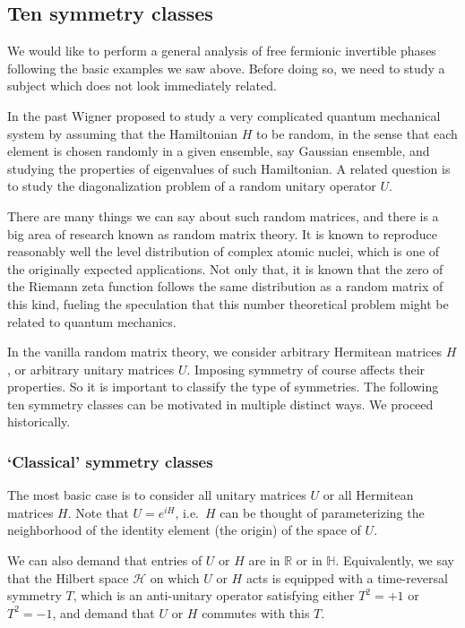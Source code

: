 \documentclass[12pt]{article}
\numberwithin{equation}{section}
\numberwithin{figure}{section}
\theoremstyle{remark}
\def\bH{\mathbb{H}}
\def\bR{\mathbb{R}}
\def\cH{\mathcal{H}}
\begin{document}
\subsection{Ten symmetry classes}

We would like to perform a general analysis of free fermionic invertible phases
following the basic examples we saw above. 
Before doing so, we need to study a subject which does not look immediately related.

In the past Wigner proposed to study a very complicated quantum mechanical system
by assuming that the Hamiltonian $H$ to be random, in the sense that
each element is chosen randomly in a given ensemble, say Gaussian ensemble,
and studying the properties of eigenvalues of such Hamiltonian. 
A related question is to study the diagonalization problem of a random unitary operator $U$.

There are many things we can say about such random matrices, and there is a big area of research known as random matrix theory. 
It is known to reproduce reasonably well the level distribution of complex atomic nuclei,
which is one of the originally expected applications. 
Not only that, it is known that the zero of the Riemann zeta function 
follows the same distribution as a random matrix of this kind,
fueling the speculation that this number theoretical problem might be related to 
quantum mechanics.

In the vanilla random matrix theory, we consider arbitrary Hermitean matrices $H$,
or arbitrary unitary matrices $U$.
Imposing symmetry of course affects their properties. 
So it is important to classify the type of symmetries. 
The following ten symmetry classes can be motivated in multiple distinct ways.
We proceed historically.

\subsubsection{`Classical' symmetry classes}

The most basic case is to consider all unitary matrices $U$ or all Hermitean matrices $H$.
Note that $U=e^{iH}$, i.e.~$H$ can be thought of parameterizing the neighborhood of
the identity element (the origin) of the space of $U$.

We can also demand that entries of $U$ or $H$ are in $\bR$ or in $\bH$.
Equivalently, we say that the Hilbert space $\cH$ on which $U$ or $H$ acts
is equipped with a time-reversal symmetry $T$, which is an anti-unitary operator 
satisfying either $T^2=+1$ or $T^2=-1$,
and demand that $U$ or $H$ commutes with this $T$.
\end{document}
